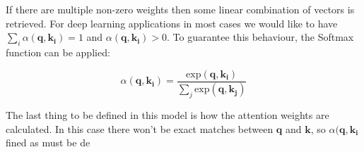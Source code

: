 If there are multiple non-zero weights then some linear combination of vectors is retrieved. 
For deep learning applications in most cases we would like to have $\sum_i\alpha(\mathbf{q}, \mathbf{k_i}) = 1$ and $\alpha(\mathbf{q}, \mathbf{k_i}) > 0$. To guarantee this behaviour, the Softmax function can be applied:

\[ \alpha(\mathbf{q}, \mathbf{k_i}) = \frac{\text{exp}(\mathbf{q}, \mathbf{k_i})}{\sum_j \text{exp}(\mathbf{q}, \mathbf{k_j})} \]

The last thing to be defined in this model is how the attention weights are calculated.
In this case there won't be exact matches between $\mathbf{q}$ and $\mathbf{k}$, so $\alpha(\mathbf{q}, \mathbf{k_i}$ fined as must be de




